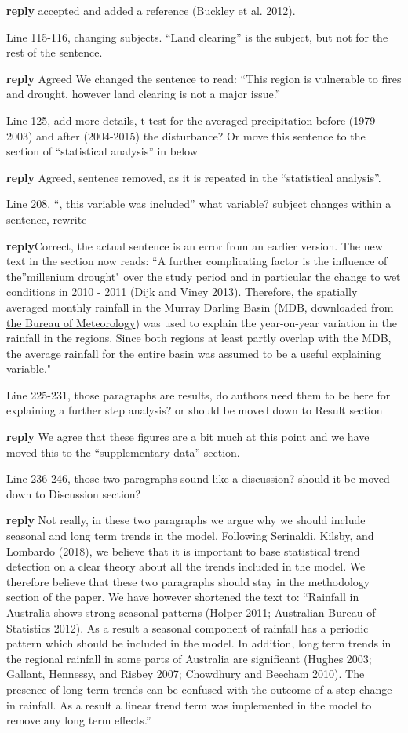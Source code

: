 \documentclass[fleqn,10pt,lineno]{wlpeerj} %
\theoremstyle{definition}
\theoremstyle{definition}
\theoremstyle{definition}
\theoremstyle{remark}
\begin{document}
\textbf{reply} accepted and added a reference (Buckley et al. 2012).

Line 115-116, changing subjects. ``Land clearing'' is the subject, but
not for the rest of the sentence.

\textbf{reply} Agreed We changed the sentence to read: ``This region is
vulnerable to fires and drought, however land clearing is not a major
issue.''

Line 125, add more details, t test for the averaged precipitation before
(1979-2003) and after (2004-2015) the disturbance? Or move this sentence
to the section of ``statistical analysis'' in below

\textbf{reply} Agreed, sentence removed, as it is repeated in the
``statistical analysis''.

Line 208, ``, this variable was included'' what variable? subject
changes within a sentence, rewrite

\textbf{reply}Correct, the actual sentence is an error from an earlier
version. The new text in the section now reads: ``A further complicating
factor is the influence of the''millenium drought" over the study period
and in particular the change to wet conditions in 2010 - 2011 (Dijk and
Viney 2013). Therefore, the spatially averaged monthly rainfall in the
Murray Darling Basin (MDB, downloaded from
\href{http://www.bom.gov.au/web01/ncc/www/cli_chg/timeseries/rain/allmonths/mdb/latest.txt}{the
Bureau of Meteorology}) was used to explain the year-on-year variation
in the rainfall in the regions. Since both regions at least partly
overlap with the MDB, the average rainfall for the entire basin was
assumed to be a useful explaining variable."

Line 225-231, those paragraphs are results, do authors need them to be
here for explaining a further step analysis? or should be moved down to
Result section

\textbf{reply} We agree that these figures are a bit much at this point
and we have moved this to the ``supplementary data'' section.

Line 236-246, those two paragraphs sound like a discussion? should it be
moved down to Discussion section?

\textbf{reply} Not really, in these two paragraphs we argue why we
should include seasonal and long term trends in the model. Following
Serinaldi, Kilsby, and Lombardo (2018), we believe that it is important
to base statistical trend detection on a clear theory about all the
trends included in the model. We therefore believe that these two
paragraphs should stay in the methodology section of the paper. We have
however shortened the text to: ``Rainfall in Australia shows strong
seasonal patterns (Holper 2011; Australian Bureau of Statistics 2012).
As a result a seasonal component of rainfall has a periodic pattern
which should be included in the model. In addition, long term trends in
the regional rainfall in some parts of Australia are significant (Hughes
2003; Gallant, Hennessy, and Risbey 2007; Chowdhury and Beecham 2010).
The presence of long term trends can be confused with the outcome of a
step change in rainfall. As a result a linear trend term was implemented
in the model to remove any long term effects.''
\end{document}
